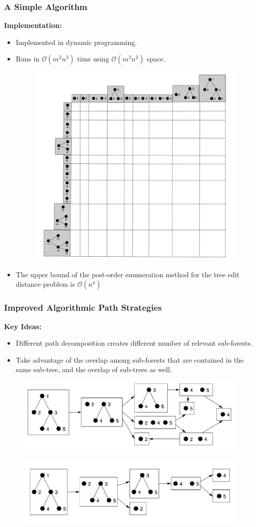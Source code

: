 \documentclass{beamer}
\begin{document}
\begin{frame}
\frametitle{A Simple Algorithm}
\textbf{Implementation:}
\begin{itemize}
\item Implemented in dynamic programming.
\item Runs in $\mathcal{O}(m^2n^2)$ time using $\mathcal{O}(m^2n^2)$ space.
\begin{figure}
	\includegraphics[width=0.5\linewidth]{ForestTable}
	\centering
\end{figure}
\item The upper bound of the post-order enumeration method for the tree edit distance problem is $\mathcal{O}(n^4)$
\end{itemize}
\end{frame}
\begin{frame}
\frametitle{Improved Algorithmic Path Strategies}
\textbf{Key Ideas:}
\begin{itemize}
\item Different path decomposition creates different number of relevant sub-forests.
\item Take advantage of the overlap among sub-forests that are contained in the same sub-tree, and the overlap of sub-trees as well.
\end{itemize}
\begin{figure}
	\includegraphics[width=0.6\linewidth]{LeftmostPathDecomposition}
	\centering
\end{figure}
\begin{figure}
	\includegraphics[width=0.6\linewidth]{RightmostPathDecomposition}
	\centering
\end{figure}
\end{frame}
\end{document}
